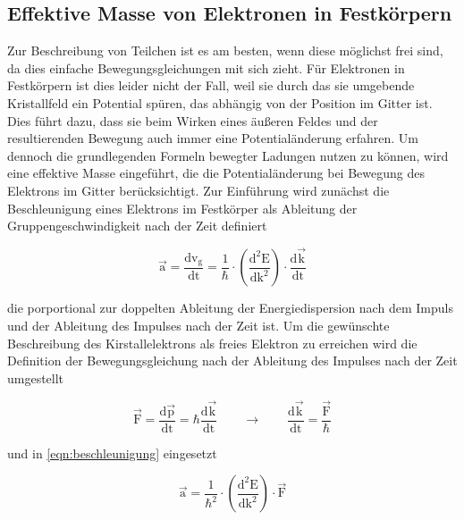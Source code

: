         \FloatBarrier

    \subsection{Effektive Masse von Elektronen in Festkörpern}
        Zur Beschreibung von Teilchen ist es am besten, wenn diese möglichst frei sind, da dies einfache Bewegungsgleichungen mit sich zieht. Für Elektronen in Festkörpern ist dies leider nicht der Fall, weil
        sie durch das sie umgebende Kristallfeld ein Potential spüren, das abhängig von der Position im Gitter ist. Dies führt dazu, dass sie beim Wirken eines äußeren Feldes und der resultierenden Bewegung
        auch immer eine Potentialänderung erfahren. Um dennoch die grundlegenden Formeln bewegter Ladungen nutzen zu können, wird eine effektive Masse eingeführt, die die Potentialänderung bei Bewegung des
        Elektrons im Gitter berücksichtigt. Zur Einführung wird zunächst die Beschleunigung eines Elektrons im Festkörper als Ableitung der Gruppengeschwindigkeit nach der Zeit definiert
        
        \begin{equation*}
            \vec{\text{a}} = \frac{\text{dv}_{\text{g}}}{\text{dt}} = \frac{1}{\hbar} \cdot \left(\frac{\text{d}^2\text{E}}{\text{dk}^2}\right) \cdot \frac{\text{d}\vec{\text{k}}}{\text{dt}}
            \label{eqn:beschleunigung}
        \end{equation*}
        
        die porportional zur doppelten Ableitung der Energiedispersion nach dem Impuls und der Ableitung des Impulses nach der Zeit ist. Um die gewünschte Beschreibung des Kirstallelektrons als freies Elektron
        zu erreichen wird die Definition der Bewegungsgleichung nach der Ableitung des Impulses nach der Zeit umgestellt

        \begin{equation*}
            \vec{\text{F}} = \frac{\text{d}\vec{\text{p}}}{\text{dt}} = \hbar \frac{\text{d}\vec{\text{k}}}{\text{dt}} \qquad \longrightarrow \qquad  \frac{\text{d}\vec{\text{k}}}{\text{dt}} = \frac{\vec{\text{F}}}{\hbar}
            \label{eqn:F_freiesElektron}
        \end{equation*}

        und in \ref{eqn:beschleunigung} eingesetzt

        \begin{equation*}
            \vec{\text{a}}  = \frac{1}{\hbar^2} \cdot \left(\frac{\text{d}^2\text{E}}{\text{dk}^2}\right) \cdot \vec{\text{F}}
        \end{equation*}

